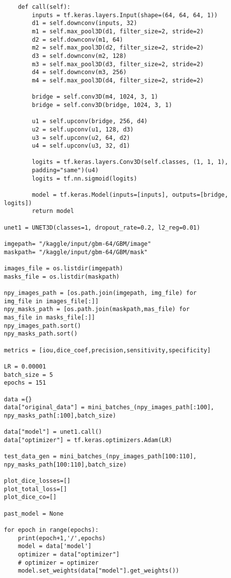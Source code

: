 \begin{verbatim}
    def call(self):
        inputs = tf.keras.layers.Input(shape=(64, 64, 64, 1))
        d1 = self.downconv(inputs, 32)
        m1 = self.max_pool3D(d1, filter_size=2, stride=2)
        d2 = self.downconv(m1, 64)
        m2 = self.max_pool3D(d2, filter_size=2, stride=2)
        d3 = self.downconv(m2, 128)
        m3 = self.max_pool3D(d3, filter_size=2, stride=2)
        d4 = self.downconv(m3, 256)
        m4 = self.max_pool3D(d4, filter_size=2, stride=2)

        bridge = self.conv3D(m4, 1024, 3, 1)
        bridge = self.conv3D(bridge, 1024, 3, 1)

        u1 = self.upconv(bridge, 256, d4)
        u2 = self.upconv(u1, 128, d3)
        u3 = self.upconv(u2, 64, d2)
        u4 = self.upconv(u3, 32, d1)

        logits = tf.keras.layers.Conv3D(self.classes, (1, 1, 1), 
        padding="same")(u4)
        logits = tf.nn.sigmoid(logits)

        model = tf.keras.Model(inputs=[inputs], outputs=[bridge, logits])
        return model

unet1 = UNET3D(classes=1, dropout_rate=0.2, l2_reg=0.01)

imgepath= "/kaggle/input/gbm-64/GBM/image"
maskpath= "/kaggle/input/gbm-64/GBM/mask"

images_file = os.listdir(imgepath)
masks_file = os.listdir(maskpath)

npy_images_path = [os.path.join(imgepath, img_file) for 
img_file in images_file[:]]
npy_masks_path = [os.path.join(maskpath,mas_file) for 
mas_file in masks_file[:]]
npy_images_path.sort()
npy_masks_path.sort()

metrics = [iou,dice_coef,precision,sensitivity,specificity]

LR = 0.00001
batch_size = 5
epochs = 151

data ={}
data["original_data"] = mini_batches_(npy_images_path[:100],
npy_masks_path[:100],batch_size)

data["model"] = unet1.call()
data["optimizer"] = tf.keras.optimizers.Adam(LR)

test_data_gen = mini_batches_(npy_images_path[100:110], 
npy_masks_path[100:110],batch_size)

plot_dice_losses=[]
plot_total_loss=[]
plot_dice_co=[]

past_model = None

for epoch in range(epochs):
    print(epoch+1,'/',epochs)
    model = data['model']
    optimizer = data["optimizer"]
    # optimizer = optimizer
    model.set_weights(data["model"].get_weights())



\end{verbatim}
